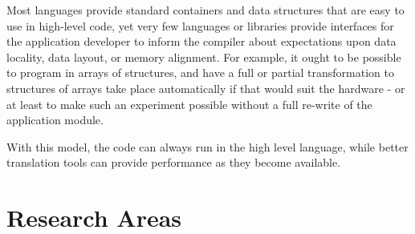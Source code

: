 Most languages provide standard containers and data structures
that are easy to use in high-level code, yet very few languages
or libraries provide interfaces for the application developer to
inform the compiler about expectations upon data locality, data layout,
or memory alignment. For example, it ought to be possible to program
in arrays of structures, and have a full or partial transformation
to structures of arrays take place automatically if that would
suit the hardware - or at least to make such an experiment
possible without a full re-write of the application module.

With this model, the code
can always run in the high level language, while better translation
tools can provide performance as they become available.



\section{Research Areas}

